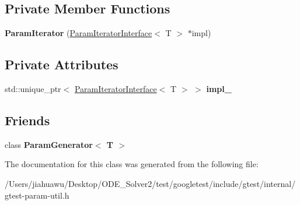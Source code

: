 \subsection*{Private Member Functions}
\begin{DoxyCompactItemize}
\item 
\mbox{\label{classtesting_1_1internal_1_1_param_iterator_acf5ad898e7f50eb82a6c367889aa07c4}} 
{\bfseries Param\+Iterator} (\mbox{\hyperlink{classtesting_1_1internal_1_1_param_iterator_interface}{Param\+Iterator\+Interface}}$<$ T $>$ $\ast$impl)
\end{DoxyCompactItemize}
\subsection*{Private Attributes}
\begin{DoxyCompactItemize}
\item 
\mbox{\label{classtesting_1_1internal_1_1_param_iterator_ab8ca1e4a23e205e4edded0adf42634c9}} 
std\+::unique\+\_\+ptr$<$ \mbox{\hyperlink{classtesting_1_1internal_1_1_param_iterator_interface}{Param\+Iterator\+Interface}}$<$ T $>$ $>$ {\bfseries impl\+\_\+}
\end{DoxyCompactItemize}
\subsection*{Friends}
\begin{DoxyCompactItemize}
\item 
\mbox{\label{classtesting_1_1internal_1_1_param_iterator_ab73a355ae191f2f7eab54b65ca557714}} 
class {\bfseries Param\+Generator$<$ T $>$}
\end{DoxyCompactItemize}


The documentation for this class was generated from the following file\+:\begin{DoxyCompactItemize}
\item 
/\+Users/jiahuawu/\+Desktop/\+O\+D\+E\+\_\+\+Solver2/test/googletest/include/gtest/internal/gtest-\/param-\/util.\+h\end{DoxyCompactItemize}
